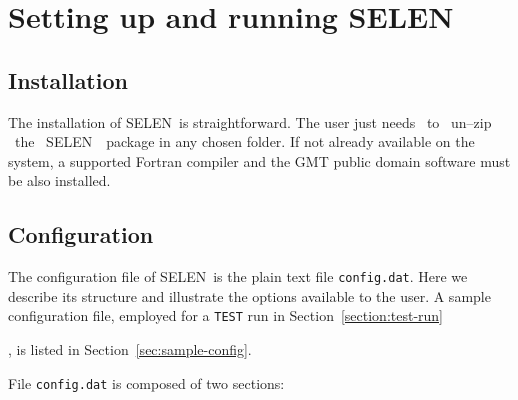 \documentclass[11pt,fleqn,a4paper,titlepage]{article}
\newcommand\selen{\textsf{SELEN~}}
\begin{document}
{\section{Setting up and running \selen}

\subsection{Installation}\label{sec:installation}
The installation of \selen is straightforward. The user just needs ~to ~un--zip ~the ~\selen ~package 
in any chosen folder.  If not already available on the system, a supported Fortran compiler and the GMT public domain software \citep{Wessel_and_Smith_1998} must be also installed.

\subsection{Configuration}\label{sec:configuration}
The configuration file of \selen is the plain text file \texttt{config.dat}. Here we describe its structure and illustrate the options available to the user. A sample configuration file, employed for a \texttt{TEST} run in Section~\ref{section:test-run}}, is listed 
in Section~\ref{sec:sample-config}. 

\vspace{0.6cm}
\noindent File \texttt{config.dat} is composed of two sections:
\end{document}
